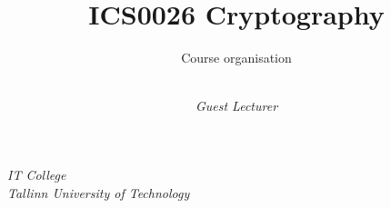 
\usepackage{graphicx}

\usepackage{csquotes}


\iffalse
\setbeamertemplate{headline}
{%
    \begin{picture}(0,0)
        \put(314,-50){%
            Owo?
        }
        \put(20,-55){%
            \rule{320pt}{0.4pt}
        }
    \end{picture}
}
\fi

\iffalse
\setbeamertemplate{footline}
{%
    \begin{picture}(0,0)
        \put(20,30){%
            \rule{320pt}{0.4pt}
        }
        \put(20,14){%
            Hihi
        }
        \put(100,14){%
            \color{oxfordblue}\insertshortdate
        }
        \put(160,14){%
            \color{oxfordblue}\insertshorttitle
        }
        \put(337,14){%
            \color{oxfordblue}\insertpagenumber/\inserttotalframenumber
        }
    \end{picture}%
}
\fi

\title[Short version of title]{ICS0026 Cryptography}
\subtitle{Course organisation}
\author%
{%
    \\
    \textit{\footnotesize Guest Lecturer}
}
\institute%
{%
    \textit{IT College}\\
    \textit{Tallinn University of Technology}
}


\begin{frame}[plain]
  \titlepage
\end{frame}

